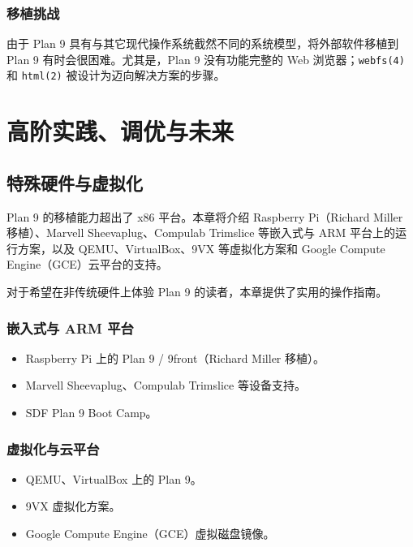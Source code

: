 \documentclass[12pt,UTF8]{ctexbook}
\begin{document}
\section{移植挑战}

由于 Plan 9 具有与其它现代操作系统截然不同的系统模型，将外部软件移植到 Plan 9 有时会很困难。尤其是，Plan 9 没有功能完整的 Web 浏览器；\texttt{webfs(4)} 和 \texttt{html(2)} 被设计为迈向解决方案的步骤。


\part{高阶实践、调优与未来}

\chapter{特殊硬件与虚拟化}

Plan 9 的移植能力超出了 x86 平台。本章将介绍 Raspberry Pi（Richard Miller 移植）、Marvell Sheevaplug、Compulab Trimslice 等嵌入式与 ARM 平台上的运行方案，以及 QEMU、VirtualBox、9VX 等虚拟化方案和 Google Compute Engine（GCE）云平台的支持。

对于希望在非传统硬件上体验 Plan 9 的读者，本章提供了实用的操作指南。

\section{嵌入式与 ARM 平台}

\begin{itemize}
\item Raspberry Pi 上的 Plan 9 / 9front（Richard Miller 移植）。
\item Marvell Sheevaplug、Compulab Trimslice 等设备支持。
\item SDF Plan 9 Boot Camp。
\end{itemize}

\section{虚拟化与云平台}

\begin{itemize}
\item QEMU、VirtualBox 上的 Plan 9。
\item 9VX 虚拟化方案。
\item Google Compute Engine（GCE）虚拟磁盘镜像。
\end{itemize}
\end{document}
